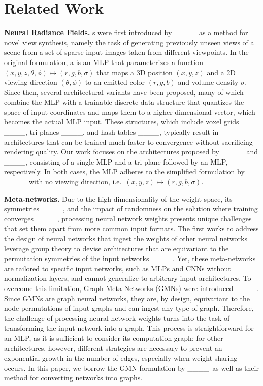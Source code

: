 \section{Related Work}
\label{sec:related}

\textbf{Neural Radiance Fields.}
\nerf{}s were first introduced by ____\ as a method for novel view synthesis, namely the task of generating previously unseen views of a scene from a set of sparse input images taken from different viewpoints. In the original formulation, a \nerf{} is an MLP that parameterizes a function $(x,y,z,\theta,\phi)\mapsto(r,g,b,\sigma)$ that maps a 3D position $(x,y,z)$ and a 2D viewing direction $(\theta,\phi)$ to an emitted color $(r,g,b)$ and volume density $\sigma$.
Since then, several architectural variants have been proposed, many of which combine the MLP with a trainable discrete data structure that quantizes the space of input coordinates and maps them to a higher-dimensional vector, which becomes the actual MLP input. These structures, which include voxel grids ____, tri-planes ____, and hash tables ____, typically result in \nerf{} architectures that can be trained much faster to convergence without sacrificing rendering quality.
Our work focuses on the \nerf{} architectures proposed by ____\ and ____, consisting of a single MLP and a tri-plane followed by an MLP, respectively. In both cases, the MLP adheres to the simplified formulation by ____\ with no viewing direction, i.e.\ $(x,y,z)\mapsto(r,g,b,\sigma)$.

\textbf{Meta-networks.} 
Due to the high dimensionality of the weight space, its symmetries ____, and the impact of randomness on the solution where training converges ____, processing neural network weights presents unique challenges that set them apart from more common input formats. The first works to address the design of neural networks that ingest the weights of other neural networks leverage group theory to devise architectures that are equivariant to the permutation symmetries of the input networks ____. Yet, these meta-networks are tailored to specific input networks, such as MLPs and CNNs without normalization layers, and cannot generalize to arbitrary input architectures. 
To overcome this limitation, Graph Meta-Networks (GMNs) were introduced ____. Since GMNs are graph neural networks, they are, by design, equivariant to the node permutations of input graphs and can ingest any type of graph. Therefore, the challenge of processing neural network weights turns into the task of transforming the input network into a graph. This process is straightforward for an MLP, as it is sufficient to consider its computation graph; for other architectures, however, different strategies are necessary to prevent an exponential growth in the number of edges, especially when weight sharing occurs. In this paper, we borrow the GMN formulation by ____\ as well as their method for converting networks into graphs.

